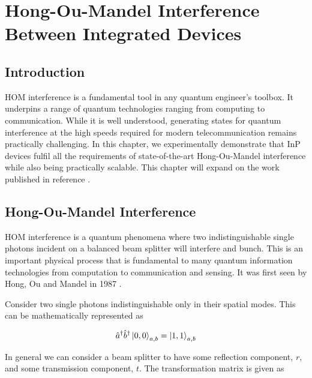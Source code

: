 %
%
\graphicspath{{./chapters/chapter03/fig03/}}

\let\textcircled=\pgftextcircled
\chapter[HOM Interference Between Integrated Devices]{Hong-Ou-Mandel Interference Between Integrated Devices}
\label{chap:hom}

\section{Introduction}

\ac{HOM} interference is a fundamental tool in any quantum engineer's toolbox. It underpins a range of quantum technologies ranging from computing to communication. While it is well understood, generating states for quantum interference at the high speeds required for modern telecommunication remains practically challenging. In this chapter, we experimentally demonstrate that \ac{InP} devices fulfil all the requirements of state-of-the-art Hong-Ou-Mandel interference while also being practically scalable. This chapter will expand on the work published in reference \cite{semenenko2019}. 

\section{Hong-Ou-Mandel Interference}

\Ac{HOM} interference is a quantum phenomena where two indistinguishable single photons incident on a balanced beam splitter will interfere and bunch. This is an important physical process that is fundamental to many quantum information technologies from computation to communication and sensing. It was first seen by Hong, Ou and Mandel in 1987 \cite{HOM}. 

Consider two single photons indistinguishable only in their spatial modes. This can be mathematically represented as 

\begin{equation}
	\hat{a}^\dagger \hat{b}^\dagger \ket{0,0}_{a,b} = \ket{1,1}_{a,b}
\end{equation}

In general we can consider a beam splitter to have some reflection component, $r$, and some transmission component, $t$. The transformation matrix is given as 

